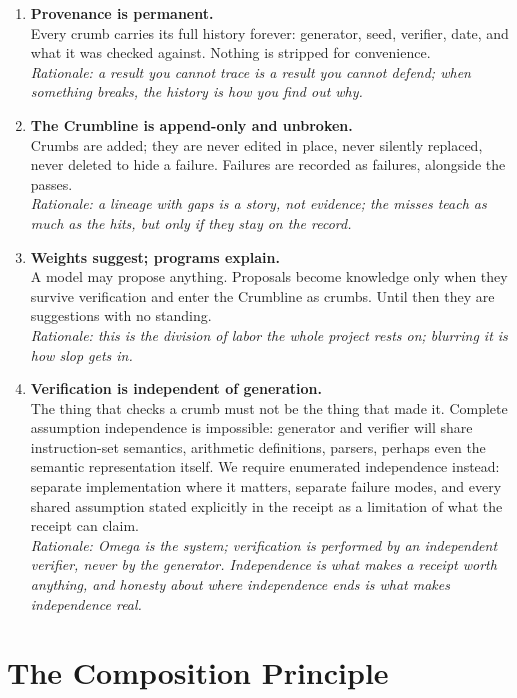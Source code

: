 \documentclass[11pt]{article}
\begin{document}
\begin{enumerate}[leftmargin=*,itemsep=0.8em]
\item \textbf{Provenance is permanent.} \\
Every crumb carries its full history forever: generator, seed, verifier, date, and what it was checked against. Nothing is stripped for convenience. \\
\textit{Rationale: a result you cannot trace is a result you cannot defend; when something breaks, the history is how you find out why.}

\item \textbf{The Crumbline is append-only and unbroken.} \\
Crumbs are added; they are never edited in place, never silently replaced, never deleted to hide a failure. Failures are recorded as failures, alongside the passes. \\
\textit{Rationale: a lineage with gaps is a story, not evidence; the misses teach as much as the hits, but only if they stay on the record.}

\item \textbf{Weights suggest; programs explain.} \\
A model may propose anything. Proposals become knowledge only when they survive verification and enter the Crumbline as crumbs. Until then they are suggestions with no standing. \\
\textit{Rationale: this is the division of labor the whole project rests on; blurring it is how slop gets in.}

\item \textbf{Verification is independent of generation.} \\
The thing that checks a crumb must not be the thing that made it. Complete assumption independence is impossible: generator and verifier will share instruction-set semantics, arithmetic definitions, parsers, perhaps even the semantic representation itself. We require enumerated independence instead: separate implementation where it matters, separate failure modes, and every shared assumption stated explicitly in the receipt as a limitation of what the receipt can claim. \\
\textit{Rationale: Omega is the system; verification is performed by an independent verifier, never by the generator. Independence is what makes a receipt worth anything, and honesty about where independence ends is what makes independence real.}

\end{enumerate}

\section{The Composition Principle}
\end{document}
